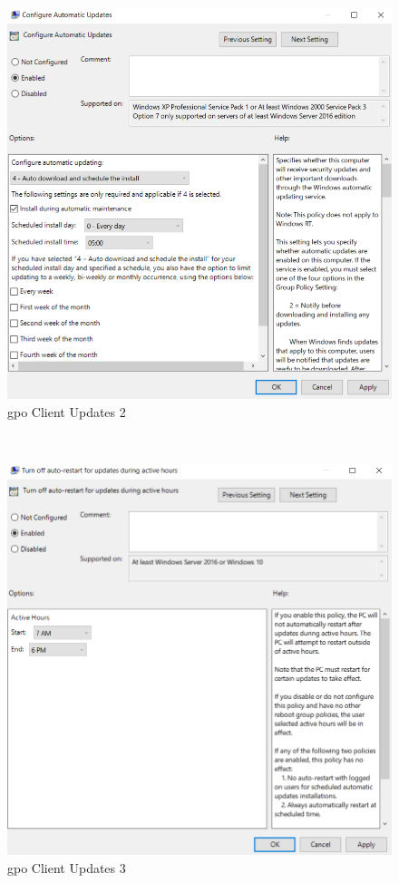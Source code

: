 \begin{minipage}{0.5\linewidth}
    \begin{figure}[H]
        \centering
        \includegraphics[width=\linewidth]{../img/Updates/client-configure-automatic-updates.png}
        \caption{\acrshort{gpo} Client Updates 2}
    \end{figure}
\end{minipage}\\
\begin{minipage}{0.5\linewidth}
    \begin{figure}[H]
        \centering
        \includegraphics[width=\linewidth]{../img/Updates/client-auto-restart-during-working-hours.png}
        \caption{\acrshort{gpo} Client Updates 3}
    \end{figure}
\end{minipage}
